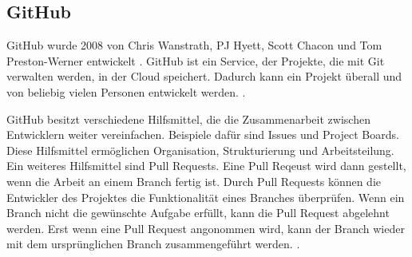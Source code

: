 \subsection{GitHub}\label{sub:t_git_gh}
GitHub wurde 2008 von Chris Wanstrath, PJ Hyett, Scott Chacon und Tom
Preston-Werner entwickelt \cite{noauthor_github_2021}. GitHub ist ein Service,
der Projekte, die mit Git verwalten werden, in der Cloud speichert. Dadurch kann
ein Projekt überall und von beliebig vielen Personen entwickelt werden.
\cite{noauthor_github_2021}.

GitHub besitzt verschiedene Hilfsmittel, die die Zusammenarbeit zwischen
Entwicklern weiter vereinfachen. Beispiele dafür sind
\guillemotleft{}Issues\guillemotright{} und \guillemotleft{}Project
Boards\guillemotright{}. Diese Hilfsmittel ermöglichen Organisation,
Strukturierung und Arbeitsteilung. Ein weiteres Hilfsmittel sind Pull Requests.
Eine Pull Reqeust wird dann gestellt, wenn die Arbeit an einem Branch fertig
ist. Durch Pull Requests können die Entwickler des Projektes die Funktionalität
eines Branches überprüfen. Wenn ein Branch nicht die gewünschte Aufgabe erfüllt,
kann die Pull Request abgelehnt werden. Erst wenn eine Pull Request angonommen
wird, kann der Branch wieder mit dem ursprünglichen Branch zusammengeführt
werden. \cite{atlassian_pull_nodate}.

